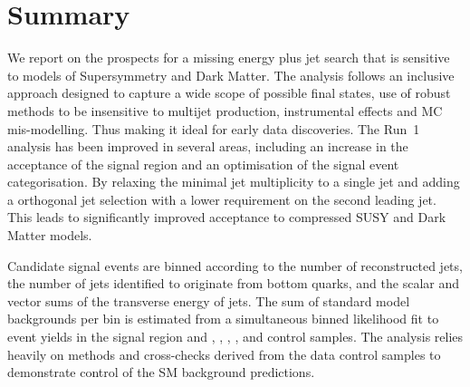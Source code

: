 \section{Summary}
\label{sec:summary}

We report on the prospects for a missing energy plus jet search that
is sensitive to models of Supersymmetry and Dark Matter.
The analysis follows an inclusive approach designed to capture a wide
scope of possible final states, use of robust methods to be
insensitive to multijet production, instrumental effects and MC
mis-modelling. Thus making it ideal for early data discoveries.
The Run~1 analysis has been improved in several areas, including an
increase in the acceptance of the signal region and an optimisation of
the signal event categorisation. By relaxing the minimal jet multiplicity 
to a single jet and adding a orthogonal jet selection with a lower 
\Pt requirement on the second leading jet. This leads to 
significantly improved acceptance to compressed SUSY and Dark Matter
models.

Candidate signal events are binned according to the number of
reconstructed jets, the number of jets identified to originate from
bottom quarks, and the scalar and vector sums of the transverse energy
of jets. The sum of standard model backgrounds per bin is estimated
from a simultaneous binned likelihood fit to event yields in the
signal region and \mj, \mmj, \ej, \eej, and \gj control samples. The
analysis relies heavily on methods and cross-checks derived from the
data control samples to demonstrate control of the SM background
predictions. 


